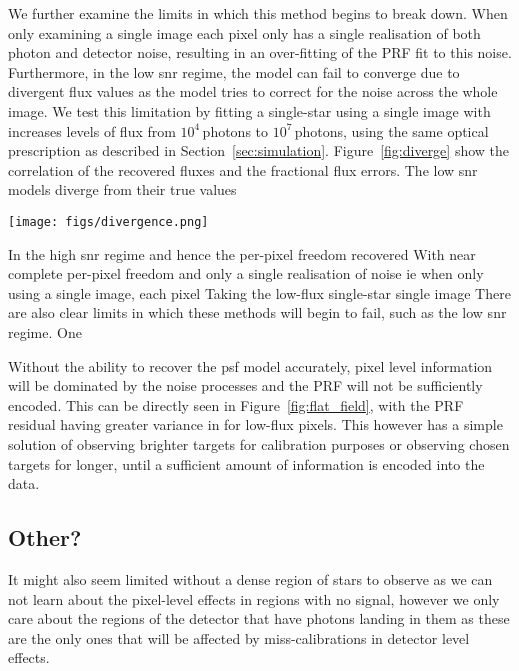 \documentclass[]{spieman}
\begin{document}
We further examine the limits in which this method begins to break down. When only examining a single image each pixel only has a single realisation of both photon and detector noise, resulting in an over-fitting of the PRF fit to this noise. Furthermore, in the low \ac{snr} regime, the model can fail to converge due to divergent flux values as the model tries to correct for the noise across the whole image. We test this limitation by fitting a single-star using a single image with increases levels of flux from $10^4$\,photons to $10^7$\,photons, using the same optical prescription as described in Section~\ref{sec:simulation}. Figure~\ref{fig:diverge} show the correlation of the recovered fluxes and the fractional flux errors. The low \ac{snr} models diverge from their true values

\begin{figure*}
    \centering
    \texttt{[image: figs/divergence.png]}
    \caption{\textcolor{red}{TODO: Caption}}
    \label{fig:diverge}
\end{figure*}

In the high \ac{snr} regime and hence the per-pixel freedom recovered With near complete per-pixel freedom and only a single realisation of noise ie when only using a single image, each pixel
Taking the low-flux single-star single image
There are also clear limits in which these methods will begin to fail, such as the low \ac{snr} regime. One 

Without the ability to recover the \ac{psf} model accurately, pixel level information will be dominated by the noise processes and the PRF will not be sufficiently encoded. This can be directly seen in Figure~\ref{fig:flat_field}, with the PRF residual having greater variance in for low-flux pixels. This however has a simple solution of observing brighter targets for calibration purposes or observing chosen targets for longer, until a sufficient amount of information is encoded into the data.

\subsection{Other?}
It might also seem limited without a dense region of stars to observe as we can not learn about the pixel-level effects in regions with no signal, however we only care about the regions of the detector that have photons landing in them as these are the only ones that will be affected by miss-calibrations in detector level effects.
\end{document}
